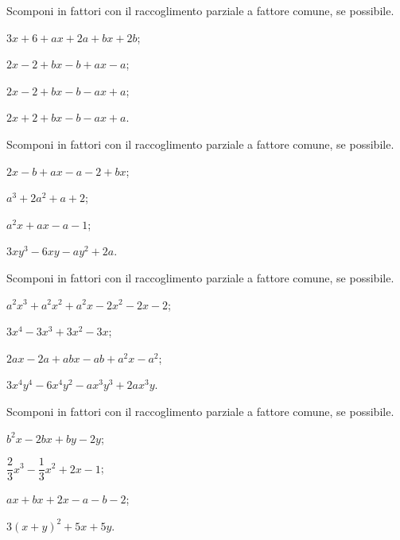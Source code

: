 \begin{esercizio}
\label{ese:15.22}
Scomponi in fattori con il raccoglimento parziale a fattore comune, se possibile.
\begin{multicols}{2}
\begin{enumeratea}
 \item $3x+6+ax+2a+bx+2b$;
 \item $2x-2+bx-b+ax-a$;
 \item $2x-2+bx-b-ax+a$;
 \item $2x+2+bx-b-ax+a$.
\end{enumeratea}
\end{multicols}
\end{esercizio}

\begin{esercizio}
\label{ese:15.23}
Scomponi in fattori con il raccoglimento parziale a fattore comune, se possibile.
\begin{multicols}{2}
\begin{enumeratea}
 \item $2x-b+ax-a-2+bx$;
 \item $a^{3}+2a^{2}+a+2$;
 \item $a^{2}x+ax-a-1$;
 \item $3xy^{3}-6xy-ay^{2}+2a$.
\end{enumeratea}
\end{multicols}
\end{esercizio}

\begin{esercizio}
\label{ese:15.24}
Scomponi in fattori con il raccoglimento parziale a fattore comune, se possibile.
\begin{multicols}{2}
\begin{enumeratea}
 \item $a^{2}x^{3}+a^{2}x^{2}+a^{2}x-2x^{2}-2x-2$;
 \item $3x^{4}-3x^{3}+3x^{2}-3x$;
 \item $2ax-2a+abx-ab+a^{2}x-a^{2}$;
 \item $3x^{4}y^{4}-6x^{4}y^{2}-ax^{3}y^{3}+2ax^{3}y$.
\end{enumeratea}
\end{multicols}
\end{esercizio}

\begin{esercizio}
\label{ese:15.25}
Scomponi in fattori con il raccoglimento parziale a fattore comune, se possibile.
\begin{multicols}{2}
\begin{enumeratea}
 \item $b^{2}x-2bx+by-2y$;
 \item $\dfrac{2}{3}x^{3}-\dfrac{1}{3}x^{2}+2x-1$;
 \item $ax+bx+2x-a-b-2$;
 \item $3(x+y)^{2}+5x+5y$.
\end{enumeratea}
\end{multicols}
\end{esercizio}

